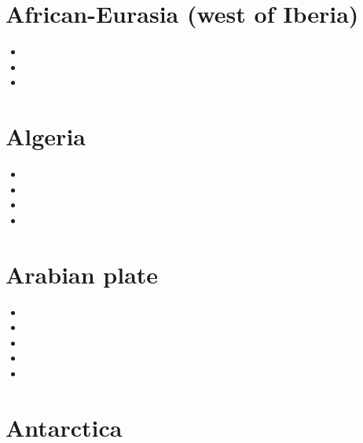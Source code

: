 \section{African-Eurasia (west of Iberia)}

\begin{small}
\begin{itemize}
\item[\twothousandthree]
\item[\twothousandten]
\item[\twothousandnineteen]
\end{itemize}
\end{small}

\section{Algeria}

\begin{small}
\begin{itemize}
\item[\twothousandthree]
\item[\twothousandfifteen]
\item[\twothousandeighteen]
\item[\twothousandtwentyone]
\end{itemize}
\end{small}

\section{Arabian plate}

\begin{small}
\begin{itemize}
\item[\twothousandthirteen] 
\item[\twothousandfifteen] 
\item[\twothousandeighteen] 
\item[\twothousandtwenty] 
\item[\twothousandtwentytwo] 
\end{itemize}
\end{small}

\section{Antarctica}

